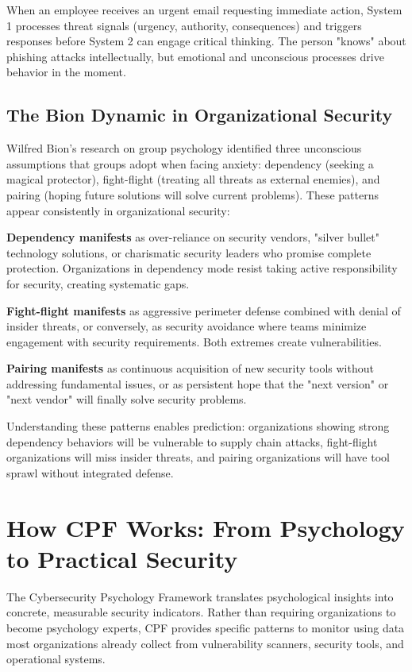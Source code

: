 \documentclass[11pt,a4paper]{article}
\begin{document}
When an employee receives an urgent email requesting immediate action, System 1 processes threat signals (urgency, authority, consequences) and triggers responses before System 2 can engage critical thinking. The person "knows" about phishing attacks intellectually, but emotional and unconscious processes drive behavior in the moment.

\subsection{The Bion Dynamic in Organizational Security}

Wilfred Bion's research on group psychology identified three unconscious assumptions that groups adopt when facing anxiety: dependency (seeking a magical protector), fight-flight (treating all threats as external enemies), and pairing (hoping future solutions will solve current problems)\cite{bion1961}. These patterns appear consistently in organizational security:

\textbf{Dependency manifests} as over-reliance on security vendors, "silver bullet" technology solutions, or charismatic security leaders who promise complete protection. Organizations in dependency mode resist taking active responsibility for security, creating systematic gaps.

\textbf{Fight-flight manifests} as aggressive perimeter defense combined with denial of insider threats, or conversely, as security avoidance where teams minimize engagement with security requirements. Both extremes create vulnerabilities.

\textbf{Pairing manifests} as continuous acquisition of new security tools without addressing fundamental issues, or as persistent hope that the "next version" or "next vendor" will finally solve security problems.

Understanding these patterns enables prediction: organizations showing strong dependency behaviors will be vulnerable to supply chain attacks, fight-flight organizations will miss insider threats, and pairing organizations will have tool sprawl without integrated defense.

\section{How CPF Works: From Psychology to Practical Security}

The Cybersecurity Psychology Framework translates psychological insights into concrete, measurable security indicators. Rather than requiring organizations to become psychology experts, CPF provides specific patterns to monitor using data most organizations already collect from vulnerability scanners, security tools, and operational systems.
\end{document}
